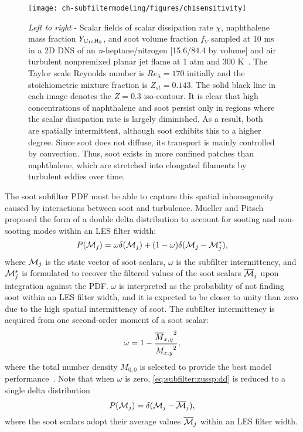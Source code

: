 \begin{figure}[htb]
  \begin{center}
    \texttt{[image: ch-subfiltermodeling/figures/chisensitivity]}
    \caption[Spatial Variability of  and Soot Fields]{\textit{Left to right} - Scalar fields of scalar dissipation rate $\chi$, naphthalene mass fraction $Y_{\ce{C10H8}}$, and soot volume fraction $f_V$ sampled at 10 ms in a 2D DNS of an \textit{n}-heptane/nitrogen [15.6/84.4 by volume] and air turbulent nonpremixed planar jet flame at 1 atm and 300 K~\cite{bisetti2012}. The Taylor scale Reynolds number is $Re_{\lambda} = 170$ initially and the stoichiometric mixture fraction is $Z_{st} = 0.143$. The solid black line in each image denotes the $Z = 0.3$ iso-contour. It is clear that high concentrations of naphthalene and soot persist only in regions where the scalar dissipation rate is largely diminished. As a result, both are spatially intermittent, although soot exhibits this to a higher degree. Since soot does not diffuse, its transport is mainly controlled by convection. Thus, soot exists in more confined patches than naphthalene, which are stretched into elongated filaments by turbulent eddies over time.}
    \label{fig:subfilter:zussp:chisensitivity}
  \end{center}
\end{figure}

The soot subfilter PDF must be able to capture this spatial inhomogeneity caused by interactions between soot and turbulence. Mueller and Pitsch~\cite{subfilterpdf2011} proposed the form of a double delta distribution to account for sooting and non-sooting modes within an LES filter width:
\begin{equation}\label{eq:subfilter:zussp:dd}
  P(\mathcal{M}_j) = \omega\delta(\mathcal{M}_j) + (1 - \omega)\delta(\mathcal{M}_j - \mathcal{M}_j^*),
\end{equation}
where $\mathcal{M}_j$ is the state vector of soot scalars, $\omega$ is the subfilter intermittency, and $\mathcal{M}_j^*$ is formulated to recover the filtered values of the soot scalars $\overline{\mathcal{M}}_j$ upon integration against the PDF. $\omega$ is interpreted as the probability of not finding soot within an LES filter width, and it is expected to be closer to unity than zero due to the high spatial intermittency of soot. The subfilter intermittency is acquired from one second-order moment of a soot scalar:
\begin{equation}\label{eq:subfilter:zussp:omega}
  \omega = 1 - \frac{{\overline{M}_{x,y}}^2}{\overline{{M_{x,y}}^2}},
\end{equation}
where the total number density $M_{0,0}$ is selected to provide the best model performance~\cite{subfilterpdf2011}. Note that when $\omega$ is zero, \cref{eq:subfilter:zussp:dd} is reduced to a single delta distribution
\begin{equation}\label{eq:subfilter:zussp:sd}
  P(\mathcal{M}_j) = \delta(\mathcal{M}_j - \overline{\mathcal{M}}_j),
\end{equation}
where the soot scalars adopt their average values $\overline{\mathcal{M}}_j$ within an LES filter width.

